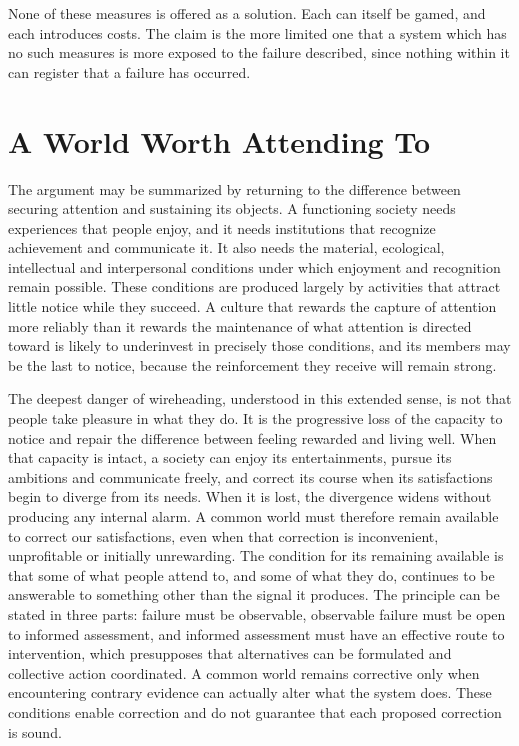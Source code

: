 \documentclass[11pt]{article}
\theoremstyle{definition}
\theoremstyle{remark}
\begin{document}
None of these measures is offered as a solution. Each can itself be gamed, and each introduces costs. The claim is the more limited one that a system which has no such measures is more exposed to the failure described, since nothing within it can register that a failure has occurred.

\section{A World Worth Attending To}

The argument may be summarized by returning to the difference between securing attention and sustaining its objects. A functioning society needs experiences that people enjoy, and it needs institutions that recognize achievement and communicate it. It also needs the material, ecological, intellectual and interpersonal conditions under which enjoyment and recognition remain possible. These conditions are produced largely by activities that attract little notice while they succeed. A culture that rewards the capture of attention more reliably than it rewards the maintenance of what attention is directed toward is likely to underinvest in precisely those conditions, and its members may be the last to notice, because the reinforcement they receive will remain strong.

The deepest danger of wireheading, understood in this extended sense, is not that people take pleasure in what they do. It is the progressive loss of the capacity to notice and repair the difference between feeling rewarded and living well. When that capacity is intact, a society can enjoy its entertainments, pursue its ambitions and communicate freely, and correct its course when its satisfactions begin to diverge from its needs. When it is lost, the divergence widens without producing any internal alarm. A common world must therefore remain available to correct our satisfactions, even when that correction is inconvenient, unprofitable or initially unrewarding. The condition for its remaining available is that some of what people attend to, and some of what they do, continues to be answerable to something other than the signal it produces. The principle can be stated in three parts: failure must be observable, observable failure must be open to informed assessment, and informed assessment must have an effective route to intervention, which presupposes that alternatives can be formulated and collective action coordinated. A common world remains corrective only when encountering contrary evidence can actually alter what the system does. These conditions enable correction and do not guarantee that each proposed correction is sound.
\end{document}
